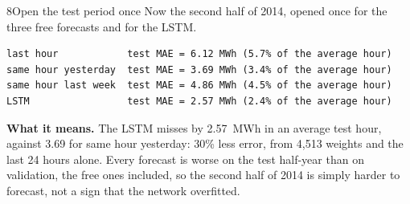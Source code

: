 \begin{labquestion}{8}{Open the test period once}
Now the second half of 2014, opened once for the three free forecasts and for the LSTM.
\end{labquestion}
\begin{labanswer}

\begin{refoutput}
\begin{lstlisting}[style=utpterminal]
last hour            test MAE = 6.12 MWh (5.7% of the average hour)
same hour yesterday  test MAE = 3.69 MWh (3.4% of the average hour)
same hour last week  test MAE = 4.86 MWh (4.5% of the average hour)
LSTM                 test MAE = 2.57 MWh (2.4% of the average hour)
\end{lstlisting}
\end{refoutput}

\textbf{What it means.} The LSTM misses by 2.57~MWh in an average test hour, against 3.69 for same hour yesterday: 30\% less error, from 4,513 weights and the last 24 hours alone. Every forecast is worse on the test half-year than on validation, the free ones included, so the second half of 2014 is simply harder to forecast, not a sign that the network overfitted.
\end{labanswer}

